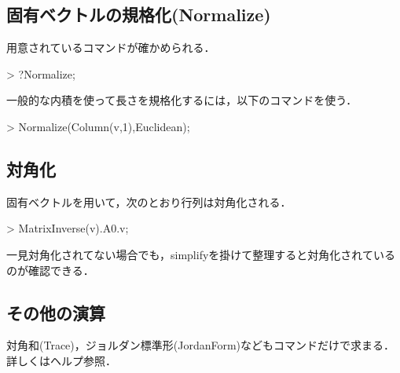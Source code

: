 \subsection{固有ベクトルの規格化(Normalize)}
用意されているコマンドが確かめられる．
\begin{MapleInput}
> ?Normalize;
\end{MapleInput}
一般的な内積を使って長さを規格化するには，以下のコマンドを使う．
\begin{MapleInput}
> Normalize(Column(v,1),Euclidean);
\end{MapleInput}
\begin{MapleOutput}
\end{MapleOutput}

\subsection{対角化}
固有ベクトルを用いて，次のとおり行列は対角化される．
\begin{MapleInput}
> MatrixInverse(v).A0.v;
\end{MapleInput}
\begin{MapleOutput}
\left[ \begin {array}{cc} -1&0\\  0&3\end {array} \right]
\end{MapleOutput}
一見対角化されてない場合でも，simplifyを掛けて整理すると対角化されているのが確認できる．

\subsection{その他の演算}
対角和(Trace)，ジョルダン標準形(JordanForm)などもコマンドだけで求まる．詳しくはヘルプ参照．
